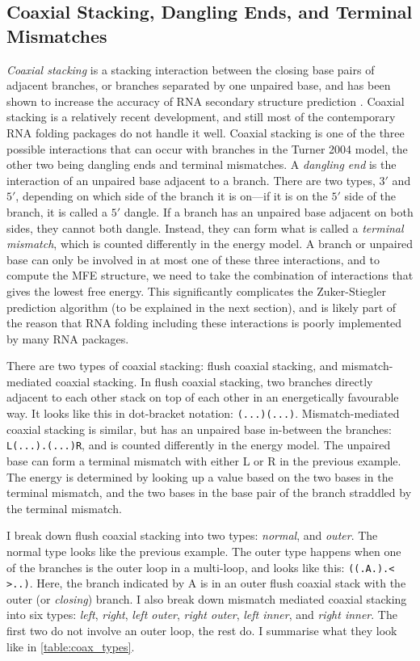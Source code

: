 \documentclass{cshonours}
\begin{document}
\subsection{Coaxial Stacking, Dangling Ends, and Terminal Mismatches}
\emph{Coaxial stacking} is a stacking interaction between the closing base pairs of adjacent branches, or branches separated by one unpaired base, and has been shown to increase the accuracy of RNA secondary structure prediction \cite{tNndb, walterCoaxial}. Coaxial stacking is a relatively recent development, and still most of the contemporary RNA folding packages do not handle it well. Coaxial stacking is one of the three possible interactions that can occur with branches in the Turner 2004 model, the other two being dangling ends and terminal mismatches. A \emph{dangling end} is the interaction of an unpaired base adjacent to a branch. There are two types, $3'$ and $5'$, depending on which side of the branch it is on---if it is on the $5'$ side of the branch, it is called a $5'$ dangle. If a branch has an unpaired base adjacent on both sides, they cannot both dangle. Instead, they can form what is called a \emph{terminal mismatch}, which is counted differently in the energy model. A branch or unpaired base can only be involved in at most one of these three interactions, and to compute the MFE structure, we need to take the combination of interactions that gives the lowest free energy. This significantly complicates the Zuker-Stiegler prediction algorithm (to be explained in the next section), and is likely part of the reason that RNA folding including these interactions is poorly implemented by many RNA packages.

There are two types of coaxial stacking: flush coaxial stacking, and mismatch-mediated coaxial stacking. In flush coaxial stacking, two branches directly adjacent to each other stack on top of each other in an energetically favourable way. It looks like this in dot-bracket notation: \texttt{(...)(...)}. Mismatch-mediated coaxial stacking is similar, but has an unpaired base in-between the branches: \texttt{L(...).(...)R}, and is counted differently in the energy model. The unpaired base can form a terminal mismatch with either L or R in the previous example. The energy is determined by looking up a value based on the two bases in the terminal mismatch, and the two bases in the base pair of the branch straddled by the terminal mismatch.

I break down flush coaxial stacking into two types: \emph{normal}, and \emph{outer}. The normal type looks like the previous example. The outer type happens when one of the branches is the outer loop in a multi-loop, and looks like this: \texttt{((.A.).<   >..)}. Here, the branch indicated by A is in an outer flush coaxial stack with the outer (or \emph{closing}) branch. I also break down mismatch mediated coaxial stacking into six types: \emph{left}, \emph{right}, \emph{left outer}, \emph{right outer}, \emph{left inner}, and \emph{right inner}. The first two do not involve an outer loop, the rest do. I summarise what they look like in \autoref{table:coax_types}.
\end{document}
